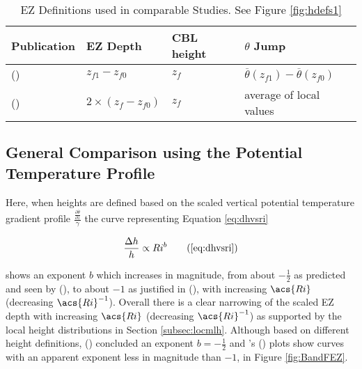\begin{table}[htbp]
\label{table:elandri}
\caption[\acs{EZ} Definitions used in comparable Studies]{\acs{EZ} Definitions used in comparable Studies.  See Figure \ref{fig:hdefs1}}

\begin{center}
\begin{tabular}{ p{4cm} p{2cm} p{1.5cm} p{3cm}}

Publication & \acs{EZ} Depth & \acs{CBL} height & $\theta$ Jump\\ \hline
\citeauthor{FedConzMir04} (\citeyear{FedConzMir04}) & $z_{f1} - z_{f0}$ & $z_{f}$ &  $\overline{\theta}(z_{f1})-\overline{\theta}(z_{f0})$\\ [.3cm] %
\citeauthor{BrooksFowler2} (\citeyear{BrooksFowler2}) & $2 \times (z_{f} - z_{f0})$ & $z_{f}$ & average of local values\\ \hline

\end{tabular}
\end{center}    
\end{table}

\subsection{General Comparison using the Potential Temperature Profile}

Here, when heights are defined based on the scaled vertical potential temperature gradient profile $\frac{\frac{\partial \overline{\theta}}{\partial z}}{\gamma}$ the curve representing Equation \ref{eq:dhvsri} 

\begin{equation}
\frac{\Delta h}{h} \propto Ri^{b} \tag{\ref{eq:dhvsri}}
\end{equation}

shows an exponent $b$ which increases in magnitude, from about $-\frac{1}{2}$ as predicted and seen by \citeauthor{Boers89} (\citeyear{Boers89}), to about $-1$ as justified in \citeauthor{StullNelEl} (\citeyear{StullNelEl}),  with increasing $\acs{Ri}$ (decreasing $\acs{Ri}^{-1}$).  Overall there is a clear narrowing of the scaled \acs{EZ} depth with increasing $\acs{Ri}$ (decreasing $\acs{Ri}^{-1}$) as supported by the local height distributions in Section \ref{subsec:locmlh}.  Although based on different height definitions, \citeauthor{FedConzMir04} (\citeyear{FedConzMir04}) concluded an exponent $b = -\frac{1}{2}$ and \citeauthor{BrooksFowler2}'s (\citeyear{BrooksFowler2}) plots show curves with an apparent exponent less in magnitude than $-1$, in Figure \ref{fig:BandFEZ}. \\

